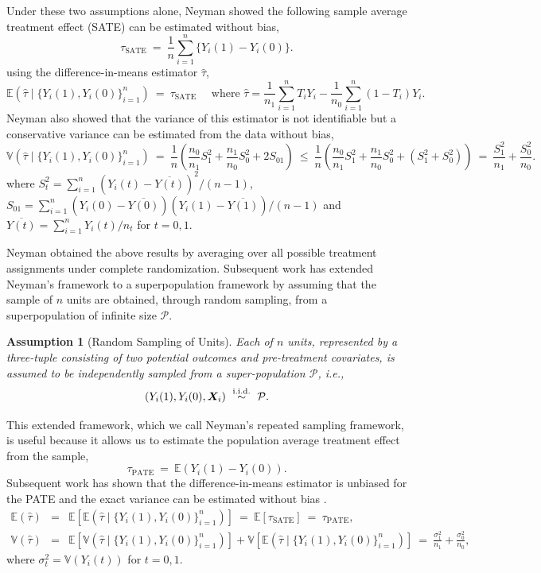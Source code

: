 \documentclass[USenglish,onecolumn]{article}
\newcommand\iid{\stackrel{\rm i.i.d.}{\sim}}
\newcommand\E{\mathbb{E}}
\newcommand\V{\mathbb{V}}
\newcommand\bX{\bm{X}}
\newtheorem{assumption}{Assumption}
\begin{document}
Under these two assumptions alone, Neyman showed the following sample
average treatment effect (SATE) can be estimated without bias,
\begin{equation*}
  \tau_{\text{SATE}} \ = \ \frac{1}{n} \sum_{i=1}^n \{Y_i(1) - Y_i(0)\}.
\end{equation*}
using the difference-in-means estimator $\hat\tau$,
\begin{equation*}
  \E(\hat\tau \mid \{Y_i(1), Y_i(0)\}_{i=1}^n) \ = \
  \tau_{\text{SATE}} \quad \text{ where } \hat\tau = \frac{1}{n_1}\sum_{i=1}^n
T_iY_i - \frac{1}{n_0} \sum_{i=1}^n (1-T_i)Y_i.
\end{equation*}
Neyman also showed that the variance of this estimator is not
identifiable but a conservative variance can be estimated from the
data without bias,
\begin{equation*}
  \V(\hat\tau \mid \{Y_i(1), Y_i(0)\}_{i=1}^n) \ = \
  \frac{1}{n}\left(\frac{n_0}{n_1}S_1^2 + \frac{n_1}{n_0}S_0^2 + 2 S_{01}\right)\  \leq  \ \frac{1}{n}\left(\frac{n_0}{n_1}S_1^2 + \frac{n_1}{n_0}S_0^2 + (S_1^2+ S_0^2)\right) \ = \
  \frac{S_1^2}{n_1} + \frac{S_0^2}{n_0}.
\end{equation*}
where $S_t^2 = \sum_{i=1}^n (Y_i(t) - \overline{Y(t)})^2/(n-1)$,
$S_{01}=\sum_{i=1}^n (Y_i(0) -
\overline{Y(0)})(Y_i(1)-\overline{Y(1)})/(n-1)$ and
$\overline{Y(t)}=\sum_{i=1}^n Y_i(t)/n_t$ for $t=0,1$.

Neyman obtained the above results by averaging over all possible
treatment assignments under complete randomization.  Subsequent work
has extended Neyman's framework to a superpopulation framework by
assuming that the sample of $n$ units are obtained, through random
sampling, from a superpopulation of infinite size $\mathcal{P}$.
\begin{assumption}[Random Sampling of Units] \label{asm:randomsample}
	Each of $n$ units, represented by a three-tuple
	consisting of two potential outcomes and pre-treatment covariates,
	is assumed to be independently sampled from a super-population
	$\mathcal{P}$, i.e.,
	$$(Y_i(1), Y_i(0), \bX_i) \ \iid \ \mathcal{P}.$$
\end{assumption}
This extended framework, which we call Neyman's repeated sampling
framework, is useful because it allows us to estimate the population
average treatment effect from the sample,
\begin{equation*}
  \tau_{\text{PATE}} \ = \ \E(Y_i(1)-Y_i(0)).
\end{equation*}
Subsequent work has shown that the difference-in-means estimator is
unbiased for the PATE and the exact variance can be estimated without
bias \citep{ding2017bridging}.
\begin{eqnarray}
  \E(\hat\tau) & = & \E[\E(\hat\tau \mid \{Y_i(1), Y_i(0)\}_{i=1}^n)]
                     \ = \ \E[\tau_{\text{SATE}}] \ = \ \tau_{\text{PATE}}, \label{eq:diffmean}\\
  \V(\hat\tau) & = & \E[\V(\hat\tau \mid \{Y_i(1), Y_i(0)\}_{i=1}^n)]
                     + \V[\E(\hat\tau \mid \{Y_i(1),
                     Y_i(0)\}_{i=1}^n)] \ = \ \frac{\sigma_1^2}{n_1} + \frac{\sigma_0^2}{n_0},\label{eq:diffvar}
\end{eqnarray} 
where $\sigma_t^2 = \V(Y_i(t))$ for $t=0,1$.
\end{document}
